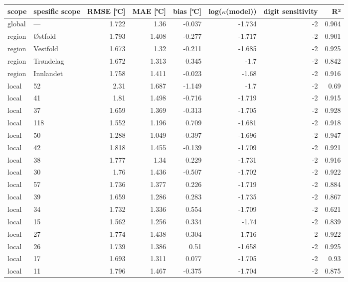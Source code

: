\begin{tabular}{llrrrrrr}
\hline
 scope   & spesific
scope           &       RMSE
[℃] &   MAE [℃] &        bias
[℃] &   log($\kappa$(model)) &    digit
sensitivity &    R² \\
\hline
 global  & ---       & 1.722 &     1.36  & -0.037 &                 -1.734 & -2 & 0.904 \\
 region  & Østfold   & 1.793 &     1.408 & -0.277 &                 -1.717 & -2 & 0.901 \\
 region  & Vestfold  & 1.673 &     1.32  & -0.211 &                 -1.685 & -2 & 0.925 \\
 region  & Trøndelag & 1.672 &     1.313 &  0.345 &                 -1.7   & -2 & 0.842 \\
 region  & Innlandet & 1.758 &     1.411 & -0.023 &                 -1.68  & -2 & 0.916 \\
 local   & 52        & 2.31  &     1.687 & -1.149 &                 -1.7   & -2 & 0.69  \\
 local   & 41        & 1.81  &     1.498 & -0.716 &                 -1.719 & -2 & 0.915 \\
 local   & 37        & 1.659 &     1.369 & -0.313 &                 -1.705 & -2 & 0.928 \\
 local   & 118       & 1.552 &     1.196 &  0.709 &                 -1.681 & -2 & 0.918 \\
 local   & 50        & 1.288 &     1.049 & -0.397 &                 -1.696 & -2 & 0.947 \\
 local   & 42        & 1.818 &     1.455 & -0.139 &                 -1.709 & -2 & 0.921 \\
 local   & 38        & 1.777 &     1.34  &  0.229 &                 -1.731 & -2 & 0.916 \\
 local   & 30        & 1.76  &     1.436 & -0.507 &                 -1.702 & -2 & 0.922 \\
 local   & 57        & 1.736 &     1.377 &  0.226 &                 -1.719 & -2 & 0.884 \\
 local   & 39        & 1.659 &     1.286 &  0.283 &                 -1.735 & -2 & 0.867 \\
 local   & 34        & 1.732 &     1.336 &  0.554 &                 -1.709 & -2 & 0.621 \\
 local   & 15        & 1.562 &     1.256 &  0.334 &                 -1.74  & -2 & 0.839 \\
 local   & 27        & 1.774 &     1.438 & -0.304 &                 -1.716 & -2 & 0.922 \\
 local   & 26        & 1.739 &     1.386 &  0.51  &                 -1.658 & -2 & 0.925 \\
 local   & 17        & 1.693 &     1.311 &  0.077 &                 -1.705 & -2 & 0.93  \\
 local   & 11        & 1.796 &     1.467 & -0.375 &                 -1.704 & -2 & 0.875 \\
\hline
\end{tabular}